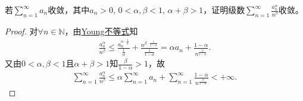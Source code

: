 \documentclass[../../main.tex]{subfiles}%
\begin{document}
\begin{example}
若$\sum\limits_{n=1}^{\infty}a_n$收敛，其中$a_n>0$, $0<\alpha,\beta<1$, $\alpha+\beta>1$，证明级数$\sum\limits_{n=1}^{\infty}\frac{a_n^{\alpha}}{n^{\beta}}$收敛。
\end{example}
\begin{proof}
对$\forall n\in\mathbb{N}$，由\hyperref[theorem:Young不等式]{Young不等式}知
\begin{align*}
\frac{a_n^{\alpha}}{n^{\beta}} \leqslant \frac{a_n^{\alpha \cdot \frac{1}{\alpha}}}{\frac{1}{\alpha}} + \frac{n^{\beta \cdot \frac{1}{1-\alpha}}}{\frac{1}{1-\alpha}} = \alpha a_n + \frac{1-\alpha}{n^{\frac{\beta}{1-\alpha}}}.
\end{align*}
又由$0<\alpha,\beta<1$且$\alpha+\beta>1$知$\frac{\beta}{1-\alpha}>1$，故
\begin{align*}
\sum\limits_{n=1}^{\infty}\frac{a_n^{\alpha}}{n^{\beta}} \leqslant \alpha \sum\limits_{n=1}^{\infty}a_n + \sum\limits_{n=1}^{\infty}\frac{1-\alpha}{n^{\frac{\beta}{1-\alpha}}} < +\infty.
\end{align*}
\end{proof}
\end{document}
